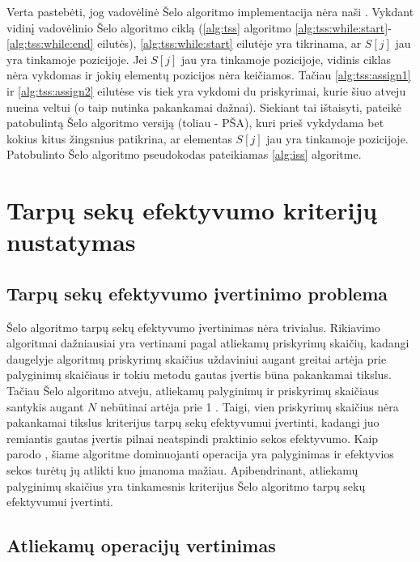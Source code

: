\documentclass{VUMIFInfKursinis}
\begin{document}
Verta pastebėti, jog vadovėlinė Šelo algoritmo implementacija nėra naši \cite{Radavičius_Baranauskas_2013}.
Vykdant vidinį vadovėlinio Šelo algoritmo ciklą (\ref{alg:tss} algoritmo \ref{alg:tss:while:start}-\ref{alg:tss:while:end} eilutės),
\ref{alg:tss:while:start} eilutėje yra tikrinama, ar $S[j]$ jau yra tinkamoje pozicijoje.
Jei $S[j]$ jau yra tinkamoje pozicijoje, vidinis ciklas nėra vykdomas ir jokių elementų pozicijos nėra keičiamos.
Tačiau \ref{alg:tss:assign1} ir \ref{alg:tss:assign2} eilutėse vis tiek yra vykdomi du priskyrimai,
kurie šiuo atveju nueina veltui (o taip nutinka pakankamai dažnai).
Siekiant tai ištaisyti, \cite{Radavičius_Baranauskas_2013} pateikė patobulintą Šelo algoritmo versiją (toliau - PŠA), kuri prieš vykdydama
bet kokius kitus žingsnius patikrina, ar elementas $S[j]$ jau yra tinkamoje pozicijoje.
Patobulinto Šelo algoritmo pseudokodas pateikiamas \ref{alg:iss} algoritme.

\section{Tarpų sekų efektyvumo kriterijų nustatymas}

\subsection{Tarpų sekų efektyvumo įvertinimo problema}

Šelo algoritmo tarpų sekų efektyvumo įvertinimas nėra trivialus.
Rikiavimo algoritmai dažniausiai yra vertinami pagal atliekamų priskyrimų skaičių, kadangi
daugelyje algoritmų priskyrimų skaičius uždaviniui augant greitai artėja prie palyginimų skaičiaus ir
tokiu metodu gautas įvertis būna pakankamai tikslus.
Tačiau Šelo algoritmo atveju, atliekamų palyginimų ir priskyrimų skaičiaus santykis augant $N$ nebūtinai artėja prie 1 \cite{Radavičius_Baranauskas_2013}.
Taigi, vien priskyrimų skaičius nėra pakankamai tikslus kriterijus tarpų sekų efektyvumui įvertinti,
kadangi juo remiantis gautas įvertis pilnai neatspindi praktinio sekos efektyvumo.
Kaip parodo \cite{ciura2001best}, šiame algoritme dominuojanti operacija yra palyginimas ir efektyvios sekos
turėtų jų atlikti kuo įmanoma mažiau.
Apibendrinant, atliekamų palyginimų skaičius yra tinkamesnis kriterijus Šelo algoritmo tarpų sekų efektyvumui įvertinti.

\subsection{Atliekamų operacijų vertinimas}
\end{document}
